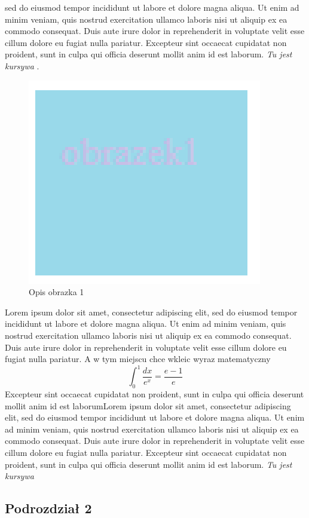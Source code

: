 \documentclass[12pt,a4paper,titlepage]{article}
\begin{document}
sed do eiusmod tempor incididunt ut labore et dolore magna aliqua.  Ut enim ad minim veniam, quis nostrud exercitation ullamco laboris nisi ut aliquip ex ea commodo consequat. Duis aute irure dolor in reprehenderit in voluptate velit esse cillum dolore eu fugiat nulla pariatur. Excepteur sint occaecat cupidatat non proident, sunt in culpa qui officia deserunt mollit anim id est laborum.  \textit{Tu jest kursywa} .
\begin{figure}[h]
\includegraphics{obrazek1.png}
\caption{Opis obrazka 1}
\label{fig:obr1}
\end{figure}
Lorem ipsum dolor sit amet, consectetur adipiscing elit, sed do eiusmod tempor incididunt ut labore et dolore magna aliqua. Ut enim ad minim veniam, quis nostrud exercitation ullamco laboris nisi ut aliquip ex ea commodo consequat. Duis aute irure dolor in reprehenderit in voluptate velit esse cillum dolore eu fugiat nulla pariatur. 
A w tym miejscu chce wkleic wyraz matematyczny
\[ \int_0^1 \frac{dx}{e^x} =  \frac{e-1}{e} \]
Excepteur sint occaecat cupidatat non proident, sunt in culpa qui officia deserunt mollit anim id est laborumLorem ipsum dolor sit amet, consectetur adipiscing elit, sed do eiusmod tempor incididunt ut labore et dolore magna aliqua.  Ut enim ad minim veniam, quis nostrud exercitation ullamco laboris nisi ut aliquip ex ea commodo consequat. Duis aute irure dolor in reprehenderit in voluptate velit esse cillum dolore eu fugiat nulla pariatur. Excepteur sint occaecat cupidatat non proident, sunt in culpa qui officia deserunt mollit anim id est laborum.  \textit{Tu jest kursywa} 

\subsection{Podrozdział 2}
\end{document}
